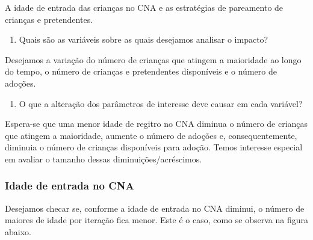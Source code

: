 \documentclass[]{book}
\providecommand{\tightlist}{%
  \setlength{\itemsep}{0pt}\setlength{\parskip}{0pt}}
\begin{document}
A idade de entrada das crianças no CNA e as estratégias de pareamento de
crianças e pretendentes.

\begin{enumerate}
\def\labelenumi{\arabic{enumi}.}
\setcounter{enumi}{1}
\tightlist
\item
  Quais são as variáveis sobre as quais desejamos analisar o impacto?
\end{enumerate}

Desejamos a variação do número de crianças que atingem a maioridade ao
longo do tempo, o número de crianças e pretendentes disponíveis e o
número de adoções.

\begin{enumerate}
\def\labelenumi{\arabic{enumi}.}
\setcounter{enumi}{2}
\tightlist
\item
  O que a alteração dos parâmetros de interesse deve causar em cada
  variável?
\end{enumerate}

Espera-se que uma menor idade de regitro no CNA diminua o número de
crianças que atingem a maioridade, aumente o número de adoções e,
consequentemente, diminuia o número de crianças disponíveis para adoção.
Temos interesse especial em avaliar o tamanho dessas
diminuições/acréscimos.

\subsubsection{Idade de entrada no CNA}\label{idade-de-entrada-no-cna}

Desejamos checar se, conforme a idade de entrada no CNA diminui, o
número de maiores de idade por iteração fica menor. Este é o caso, como
se observa na figura abaixo.
\end{document}
